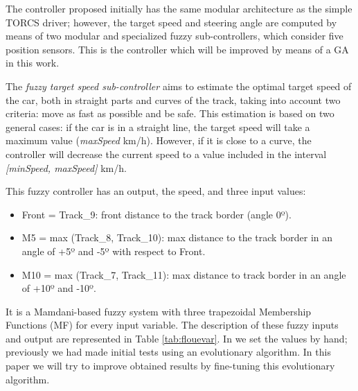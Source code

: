 \documentclass[conference]{IEEEtran}
\begin{document}
The controller proposed initially \cite{evo17} has the same modular
architecture as the simple TORCS driver; however, the target speed and
steering angle are computed by means of two modular and specialized
fuzzy sub-controllers, which consider five position sensors. This is
the controller which will be improved by means of a GA in this
work.

The {\em fuzzy target speed sub-controller} aims to estimate the
optimal target speed of the car, both in straight parts and curves of
the track, taking into account two criteria: move as fast as possible
and be safe. This estimation is based on two general cases: if the car
is in a straight line, the target speed will take a maximum value
(\textit{maxSpeed} km/h). However, if it is close to a curve, the
controller will decrease the current speed to a value included in the
interval \textit{[minSpeed, maxSpeed]} km/h. 

This fuzzy controller has an output, the speed, and three input values:
\begin{itemize}
	\item Front = Track\_9: front distance to the track border (angle 0º).  %
	\item M5 = max (Track\_8, Track\_10): max distance to the track border in an angle of +5º and -5º with respect to Front.
	\item M10 = max (Track\_7, Track\_11): max distance to track border in an angle of +10º and -10º.
\end{itemize}

It is a Mamdani-based fuzzy system \cite{iancu2012} with three
trapezoidal Membership Functions (MF) for every input variable. The
description of these fuzzy inputs and output are represented in Table
\ref{tab:flouevar}. In \cite{evo17} we set the values by hand;
previously we had made initial tests using an evolutionary
algorithm. In this paper we will try to improve obtained results by
fine-tuning this evolutionary algorithm. %
\end{document}
